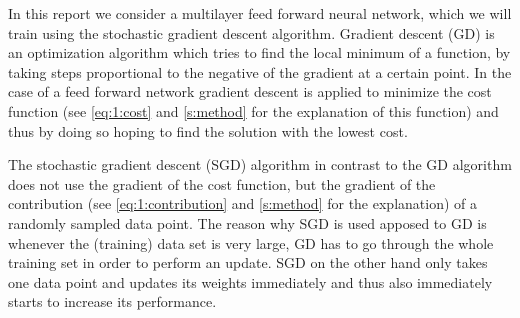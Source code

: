 In this report we consider a multilayer feed forward neural network, which we will train using the stochastic gradient descent algorithm. Gradient descent (GD) is an optimization algorithm which tries to find the local minimum of a function, by taking steps proportional to the negative of the gradient at a certain point. In the case of a feed forward network gradient descent is applied to minimize the cost function (see \eqref{eq:1:cost} and \cref{s:method} for the explanation of this function) and thus by doing so hoping to find the solution with the lowest cost. 

The stochastic gradient descent (SGD) algorithm in contrast to the GD algorithm does not use the gradient of the cost function, but the gradient of the contribution (see \eqref{eq:1:contribution} and \cref{s:method} for the explanation) of a randomly sampled data point. The reason why SGD is used apposed to GD is whenever the (training) data set is very large, GD has to go through the whole training set in order to perform an update. SGD on the other hand only takes one data point and updates its weights immediately and thus also immediately starts to increase its performance. 
